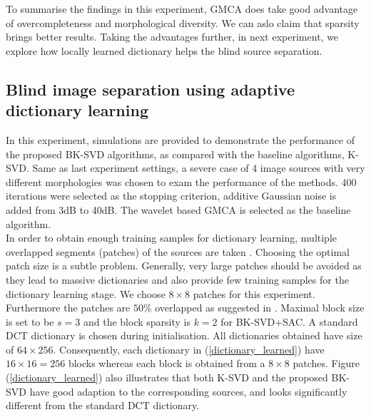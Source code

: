 
To summarise the findings in this experiment, GMCA does take good advantage of overcompleteness and morphological diversity. We can aslo claim that sparsity brings better results. Taking the advantages further, in next experiment, we explore how locally learned dictionary helps the blind source separation.\\

\subsection{Blind image separation using adaptive dictionary learning}

In this experiment, simulations are provided to demonstrate the performance of the proposed BK-SVD algorithms, as compared with the baseline algorithms, K-SVD. Same as last experiment settings, a severe case of 4 image sources with very different morphologies was chosen to exam the performance of the methods. 400 iterations were selected as the stopping criterion, additive Gaussian noise is added from 3dB to 40dB. The wavelet based GMCA is selected as the baseline algorithm.\\

In order to obtain enough training samples for dictionary learning, multiple overlapped segments (patches) of the sources are taken \cite{VAbolghasemi2012}. Choosing the optimal patch size is a subtle problem. Generally, very large patches should be avoided as they lead to massive dictionaries and also provide few training samples for the dictionary learning stage. We choose $8\times 8$ patches for this experiment. Furthermore the patches are $50\%$ overlapped as suggested in \cite{VAbolghasemi2012}. Maximal block size is set to be $s= 3$ and the block sparsity is $k=2$ for BK-SVD+SAC. A standard DCT dictionary is chosen during initialisation. All dictionaries obtained have size of $64\times 256$. Consequently, each dictionary in (\ref{dictionary_learned}) have $16 \times 16 = 256$ blocks whereas each block is obtained from a $8\times 8$ patches. Figure (\ref{dictionary_learned}) also illustrates that both K-SVD and the proposed BK-SVD have good adaption to the corresponding sources, and looks significantly different from the standard DCT dictionary.\\

